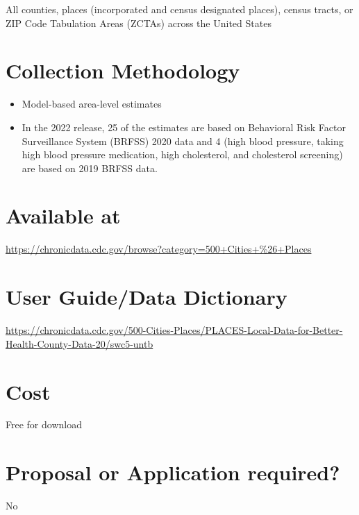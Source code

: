 \documentclass[
]{book}
\providecommand{\tightlist}{%
  \setlength{\itemsep}{0pt}\setlength{\parskip}{0pt}}
\begin{document}
All counties, places (incorporated and census designated places), census tracts, or ZIP Code Tabulation Areas (ZCTAs) across the United States

\hypertarget{collection-methodology-72}{%
\section{Collection Methodology}\label{collection-methodology-72}}

\begin{itemize}
\tightlist
\item
  Model-based area-level estimates
\item
  In the 2022 release, 25 of the estimates are based on Behavioral Risk Factor Surveillance System (BRFSS) 2020 data and 4 (high blood pressure, taking high blood pressure medication, high cholesterol, and cholesterol screening) are based on 2019 BRFSS data.
\end{itemize}

\hypertarget{available-at-72}{%
\section{Available at}\label{available-at-72}}

\url{https://chronicdata.cdc.gov/browse?category=500+Cities+\%26+Places}

\hypertarget{user-guidedata-dictionary-72}{%
\section{User Guide/Data Dictionary}\label{user-guidedata-dictionary-72}}

\url{https://chronicdata.cdc.gov/500-Cities-Places/PLACES-Local-Data-for-Better-Health-County-Data-20/swc5-untb}

\hypertarget{cost-72}{%
\section{Cost}\label{cost-72}}

Free for download

\hypertarget{proposal-or-application-required-72}{%
\section{Proposal or Application required?}\label{proposal-or-application-required-72}}

No
\end{document}
